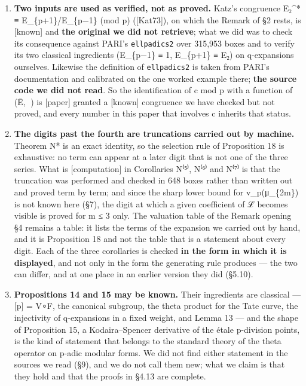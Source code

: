 \documentclass[11pt,a4paper]{article}
\theoremstyle{named}
\begin{document}
\begin{enumerate}[leftmargin=1.4em,itemsep=.2em,topsep=.3em]
\item \textbf{Two inputs are used as verified, not as proved.} Katz's congruence E₂\textasciicircum{}* ≡ E\_\{p+1\}/E\_\{p−1\} (mod p) ([Kat73]), on which the Remark of §2 rests, is [known] and \textbf{the original we did not retrieve}; what we did was to check its consequence against PARI's \texttt{ellpadics2} over 315,953 boxes and to verify its two classical ingredients (E\_\{p−1\} ≡ 1, E\_\{p+1\} ≡ E₂) on q-expansions ourselves. Likewise the definition of \texttt{ellpadics2} is taken from PARI's documentation and calibrated on the one worked example there; \textbf{the source code we did not read}. So the identification of c mod p with a function of (Ē, ) is [paper] granted a [known] congruence we have checked but not proved, and every number in this paper that involves c inherits that status.
\item \textbf{The digits past the fourth are truncations carried out by machine.} Theorem N* is an exact identity, so the selection rule of Proposition 18 is exhaustive: no term can appear at a later digit that is not one of the three series. What is [computation] in Corollaries N⁽⁵⁾, N⁽⁶⁾ and N⁽⁷⁾ is that the truncation was performed and checked in 648 boxes rather than written out and proved term by term; and since the sharp lower bound for v\_p(μ\_\{2m\}) is not known here (§7), the digit at which a given coefficient of ℒ becomes visible is proved for m ≤ 3 only. The valuation table of the Remark opening §4 remains a table: it lists the terms of the expansion we carried out by hand, and it is Proposition 18 and not the table that is a statement about every digit. Each of the three corollaries is checked \textbf{in the form in which it is displayed}, and not only in the form the generating rule produces — the two can differ, and at one place in an earlier version they did (§5.10).
\item \textbf{Propositions 14 and 15 may be known.} Their ingredients are classical — [p] = V∘F, the canonical subgroup, the theta product for the Tate curve, the injectivity of q-expansions in a fixed weight, and Lemma 13 — and the shape of Proposition 15, a Kodaira–Spencer derivative of the étale p-division points, is the kind of statement that belongs to the standard theory of the theta operator on p-adic modular forms. We did not find either statement in the sources we read (§9), and we do not call them new; what we claim is that they hold and that the proofs in §4.13 are complete.

\end{enumerate}
\end{document}
